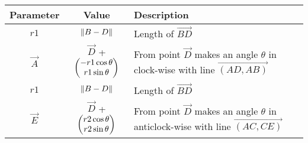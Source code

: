 \begin{tabular}{|c|c|p{5cm}|}
\hline
\textbf{Parameter} & \textbf{Value} & \textbf{Description} \\
\hline
	$r1$ & $\left\lVert B-D\right\rVert$ & Length of $\vec{BD}$ \\
\hline
	$\vec{A}$ & $\vec{D}$ + $\begin{pmatrix}-r1 \cos \theta  \\ r1 \sin \theta\end{pmatrix}$ & From point $\vec{D}$ makes an angle $\theta$ in clock-wise with line $\vec{(AD, AB)}$  \\
\hline
	  
	$r1$ & $\left\lVert B-D\right\rVert$ & Length of $\vec{BD}$ \\
\hline       
	$\vec{E}$ & $\vec{D}$ + $\begin{pmatrix}r2 \cos \theta  \\ r2 \sin \theta\end{pmatrix}$ & From point $\vec{D}$ makes an angle $\theta$ in anticlock-wise with line $\vec{(AC, CE)}$  \\  
\hline

\end{tabular}
